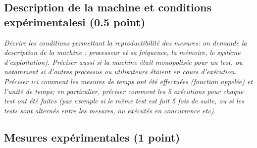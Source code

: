 \documentclass[a4paper,10pt,french]{article}
\begin{document}
  \subsection{Description de la machine et conditions expérimentalesi (0.5 point) }
     {\em  Décrire les conditions permettant la reproductibilité des mesures: on demande la description
      de la machine : processeur et sa fréquence, la mémoire, le système d'exploitation). Préciser aussi si la machine était monopolisée pour un test, ou notamment si 
       d'autres processus ou utilisateurs étaient en cours d'exécution.\\
       Préciser ici  comment les mesures de temps ont été effectuées (fonction appelée) et l'unité de temps; en particulier, 
       préciser comment les 5 exécutions pour chaque test ont été faites (par exemple si le même test est fait 5 fois de suite, ou si les tests sont alternés entre
       les mesures, ou exécutés en concurrence etc). 
       
     }

  \subsection{Mesures expérimentales (1 point)}
\end{document}
